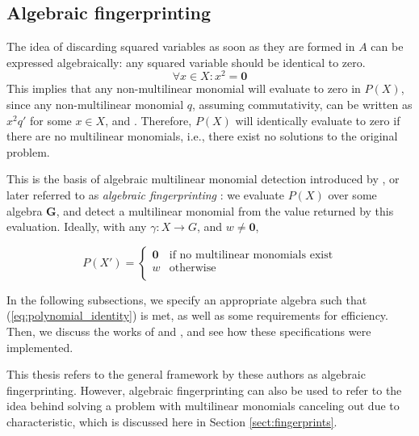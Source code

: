 \subsection{Algebraic fingerprinting}
\label{sect:algebraic_fingerprinting}

The idea of discarding squared variables as soon as they are formed in $A$ 
can be expressed algebraically: any squared variable should be identical to
zero. 
\begin{equation}
  \label{eq:squared_to_zero}
\forall x \in X: x^2 = \mathbf{0}
\end{equation}
This implies that any non-multilinear monomial will evaluate to zero in $P(X)$, since 
any non-multilinear monomial $q$, assuming commutativity, can be written as $x^2q'$ 
for some $x \in X$, and . 
Therefore, $P(X)$ will identically evaluate to zero if there are no multilinear monomials, 
i.e., there exist no solutions to the original problem.

This is the basis of algebraic multilinear monomial detection introduced by 
\citeauthor{Koutis08} \cite{Koutis08}, or later referred to as \emph{algebraic fingerprinting} \cite{KouWil15}: 
we evaluate $P(X)$ over some algebra $\mathbf{G}$, and detect a multilinear monomial from 
the value returned by this evaluation. Ideally, with any $\gamma \colon X \to
G$,
and $w \neq \mathbf{0}$, 

\begin{equation}
  \label{eq:polynomial_identity}
  P(X') =
    \begin{cases}
      \mathbf{0} & \text{if no multilinear monomials exist}\\
      w & \text{otherwise}\\
    \end{cases}       
\end{equation}

In the following subsections, we specify an appropriate algebra such that 
(\ref{eq:polynomial_identity}) is met, as well as some requirements for efficiency. 
Then, we discuss the works of \citeauthor{Koutis08} and \citeauthor{Williams09} \cite{Koutis08, Williams09}, 
and see how these specifications were implemented.

This thesis refers to the general framework \cite{KouWil09, KouWil15} by these 
authors as algebraic fingerprinting. However, algebraic fingerprinting can also 
be used to refer to the idea behind solving a problem 
with multilinear monomials canceling out due to characteristic, 
which is discussed here in Section \ref{sect:fingerprints}.

